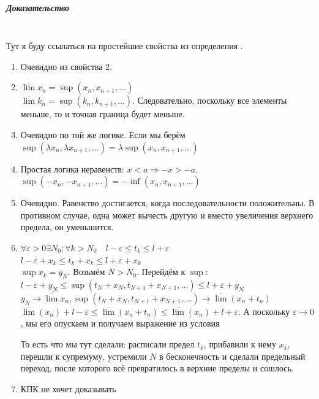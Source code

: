 \documentclass{article}
\let\vanillasubparagraph\subparagraph
\renewcommand{\subparagraph}[1]{\vanillasubparagraph{#1}\mbox{}\\}
\begin{document}
\subparagraph{Доказательство}
Тут я буду ссылаться на простейшие свойства из определения .
\begin{enumerate}
    \item Очевидно из свойства 2.
    
    \item $\overline{\lim} x_n = \sup(x_n, x_{n+1}, \ldots)$\\
    $\overline{\lim} k_n = \sup(k_n, k_{n+1}, \ldots)$. Следовательно, поскольку все элементы меньше, то и точная граница будет меньше. 
    
    \item Очевидно по той же логике. Если мы берём $\sup(\lambda x_n, \lambda x_{n+1}, \ldots) = \lambda \sup(x_n, x_{n+1}, \ldots)$
    
    \item Простая логика неравенств: $x < a \Rightarrow -x > -a$. $\sup(-x_n, -x_{n+1}, \ldots) = -\inf(x_n, x_{n+1}, \ldots)$
    
    \item Очевидно. Равенство достигается, когда последовательности положительны. В противном случае, одна может вычесть другую и вместо увеличения верхнего предела, он уменьшится.
    
    \item $\forall \varepsilon > 0 \exists N_0 : \forall k > N_0 \quad l - \varepsilon \le t_k \le l + \varepsilon$\\
    $l - \varepsilon + x_k \le t_k + x_k \le l + \varepsilon + x_k$\\
    $\sup x_k = y_N$. Возьмём $N > N_0$. Перейдём к $\sup$: $l - \varepsilon + y_N \le \sup(t_N + x_N, t_{N+1} + x_{N+1}, \ldots) \le l + \varepsilon + y_N$\\
    $y_N \rightarrow \overline{\lim}x_n, \sup(t_N + x_N, t_{N+1} + x_{N+1}, \ldots) \rightarrow \overline{\lim} (x_n + t_n)$\\
    $\overline{\lim}(x_n) + l - \varepsilon \le \overline{\lim} (x_n + t_n) \le \overline{\lim} (x_n) + l + \varepsilon$. А поскольку $\varepsilon \rightarrow 0$, мы его опускаем и получаем выражение из условия
    
    То есть что мы тут сделали: расписали предел $t_k$, прибавили к нему $x_k$, перешли к супремуму, устремили $N$ в бесконечность и сделали предельный переход, после которого всё превратилось в верхние пределы и сошлось.
    
    \item КПК не хочет доказывать \Smiley
\end{enumerate}
\end{document}

